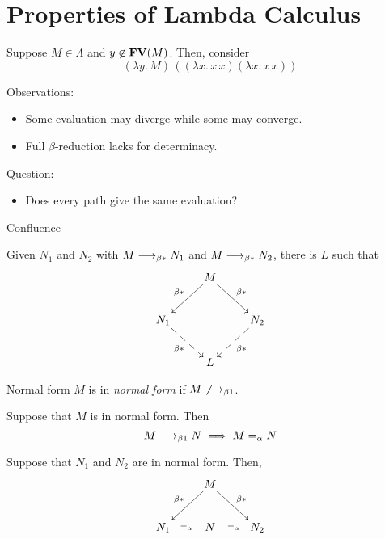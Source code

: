 \section{Properties of Lambda Calculus}

\begin{frame}
  \begin{example}
    Suppose $M \in \Lambda$ and $y \not\in \mathbf{FV}(M)$. 
    Then, consider 
    \[
      (\lambda y.\, M)\, ((\lambda x.\, x\,x)(\lambda x.\, x\, x))
    \]
  \end{example}
  Observations:
  \begin{itemize}
    \item Some evaluation may diverge while some may converge.
    \item Full $\beta$-reduction lacks for determinacy. 
  \end{itemize}
  Question:
  \begin{itemize}
    \item Does every path give the same evaluation?
  \end{itemize}
\end{frame}

\begin{frame}{Confluence}
\begin{theorem}
  Given $N_1$ and $N_2$ with $M \longrightarrow_{\beta*} N_1$ and $M\longrightarrow_{\beta*} N_2$, there is $L$
  such that
  \[
    \xymatrix{
      & M \ar[rd]^{\beta*} \ar[ld]_{\beta*} \\
      N_1 \ar@{-->}[rd]_{\beta*} & & N_2 \ar@{-->}[ld]^{\beta*} \\
      & L
    }
  \]
\end{theorem}
\end{frame}

\begin{frame}{Normal form}
  $M$ is in \emph{normal form} if $M \not\longrightarrow_{\beta1}$. 

  \begin{lemma}
    Suppose that $M$ is in normal form. Then 
    \[
      M \longrightarrow_{\beta1} N
      \implies M =_\alpha N
    \]
    
  \end{lemma}

  \begin{corollary}\label{coro:uniqueness-normal}
    Suppose that $N_1$ and $N_2$ are in normal form. Then, 
    \[
      \xymatrix{
        & M \ar[rd]^{\beta*} \ar[ld]_{\beta*} \\
        N_1 \ar@{}[r]|{=_{\alpha}} & N & N_2 \ar@{}[l]|{=_\alpha} \\
      }
    \]
  \end{corollary}
\end{frame}

